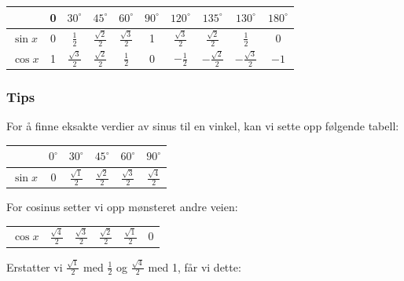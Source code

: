 



	
 \label{sincoseksakt}
\begin{center}
	\renewcommand{\arraystretch}{1.5}	
	\begin{tabular}{l|c|c|c|c|c|c|c|c|c}
		& 0&$30^\circ$ & $45^\circ$ &$60^\circ$ & $90^\circ$ & $ 120^\circ $ & $ 135^\circ$ & $ 130^\circ $ & $ 180^\circ $    \\
		\hline
		$\sin x$ & 0 &$\frac{1}{2}$ & $\frac{\sqrt{2}}{2}$ & $\frac{\sqrt{3}}{2}$ & 1 & $ \frac{\sqrt{3}}{2} $ & $ \frac{\sqrt{2}}{2} $ & $ \frac{1}{2} $ & $ 0 $\\
		$\cos x$ & 1 & $\frac{\sqrt{3}}{2}$ & $\frac{\sqrt{2}}{2}$ & $\frac{1}{2}$ & 0 & $ -\frac{1}{2} $ & $ -\frac{\sqrt{2}}{2} $ & $ -\frac{\sqrt{3}}{2} $ & $ -1 $
	\end{tabular}
\end{center}
\subsubsection{Tips}
For å finne eksakte verdier av sinus til en vinkel, kan vi sette opp følgende tabell:\vs \renewcommand{\arraystretch}{1.5}	
\begin{center}
	\begin{tabular}{l|c|c|c|c|c|}
		& $0^\circ$&$30^\circ$ & $45^\circ$ &$60^\circ$ & $90^\circ$    \\
		\hline
		$\sin x$ & 0 &$\frac{\sqrt{1}}{2}$ & $\frac{\sqrt{2}}{2}$ & $\frac{\sqrt{3}}{2}$ & $ \frac{\sqrt{4}}{2} $ \\
	\end{tabular}
\end{center}
For cosinus setter vi opp mønsteret andre veien:
\begin{center}
	\begin{tabular}{l|c|c|c|c|c}
		$\cos x$ & $\frac{\sqrt{4}}{2}  $ & $\frac{\sqrt{3}}{2}$ & $\frac{\sqrt{2}}{2}$ & $\frac{\sqrt{1}}{2}$ & 0 \\
	\end{tabular}
\end{center}
Erstatter vi $ {\frac{\sqrt{1}}{2}} $ med $ \frac{1}{2} $ og $ \frac{\sqrt{4}}{2} $ med 1, får vi dette:

